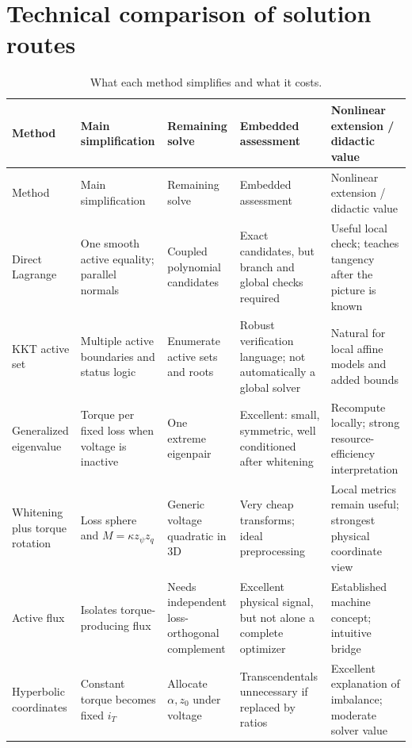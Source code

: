 \section{Technical comparison of solution routes}
\label{sec:comparison}

\begin{landscape}
\scriptsize\sloppy
\renewcommand{\arraystretch}{0.88}
\setlength{\tabcolsep}{2.5pt}
\begin{longtable}{@{}>{\raggedright\arraybackslash}p{.13\linewidth}>{\raggedright\arraybackslash}p{.18\linewidth}>{\raggedright\arraybackslash}p{.15\linewidth}>{\raggedright\arraybackslash}p{.20\linewidth}>{\raggedright\arraybackslash}p{.22\linewidth}@{}}
\caption{What each method simplifies and what it costs.}\label{tab:comparison}\\
\toprule
Method & Main simplification & Remaining solve & Embedded assessment & Nonlinear extension / didactic value\\
\midrule
\endfirsthead
\toprule
Method & Main simplification & Remaining solve & Embedded assessment & Nonlinear extension / didactic value\\
\midrule
\endhead
Direct Lagrange & One smooth active equality; parallel normals & Coupled polynomial candidates & Exact candidates, but branch and global checks required & Useful local check; teaches tangency after the picture is known\\
KKT active set & Multiple active boundaries and status logic & Enumerate active sets and roots & Robust verification language; not automatically a global solver & Natural for local affine models and added bounds\\
Generalized eigenvalue & Torque per fixed loss when voltage is inactive & One extreme eigenpair & Excellent: small, symmetric, well conditioned after whitening & Recompute locally; strong resource-efficiency interpretation\\
Whitening plus torque rotation & Loss sphere and \(M=\kappa z_\psi z_q\) & Generic voltage quadratic in 3D & Very cheap transforms; ideal preprocessing & Local metrics remain useful; strongest physical coordinate view\\
Active flux & Isolates torque-producing flux & Needs independent loss-orthogonal complement & Excellent physical signal, but not alone a complete optimizer & Established machine concept; intuitive bridge\\
Hyperbolic coordinates & Constant torque becomes fixed \(i_T\) & Allocate \(\alpha,z_0\) under voltage & Transcendentals unnecessary if replaced by ratios & Excellent explanation of imbalance; moderate solver value\\

\end{longtable}
\end{landscape}
